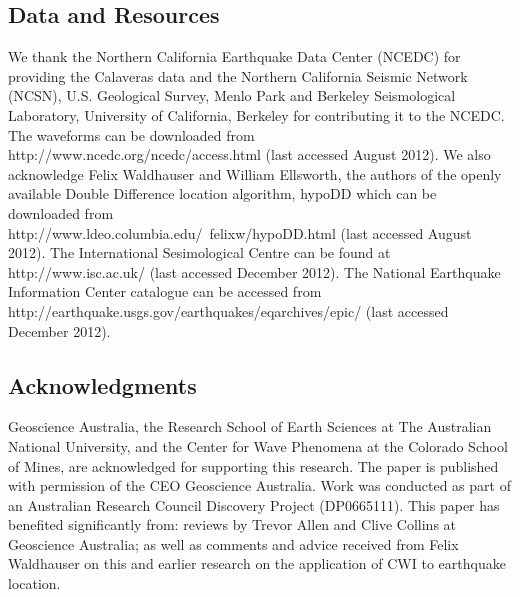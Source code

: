 \documentclass[12pt,double]{article}
\begin{document}
\vspace{2em}
\begin{centering}
\section*{Data and Resources}
\end{centering}
We thank the Northern California Earthquake Data Center (NCEDC) for
providing the Calaveras data and the Northern California Seismic
Network (NCSN), U.S. Geological Survey, Menlo Park and Berkeley
Seismological Laboratory, University of California, Berkeley for
contributing it to the NCEDC. The waveforms can be downloaded from \\
http://www.ncedc.org/ncedc/access.html (last accessed August 2012). 
We also acknowledge Felix
Waldhauser and William Ellsworth, the authors of the openly
available Double Difference location algorithm, hypoDD which can be
downloaded from \\
http://www.ldeo.columbia.edu/~felixw/hypoDD.html
(last accessed August 2012).
The International Sesimological Centre can be found at \\
http://www.isc.ac.uk/ (last accessed December 2012).
The National Earthquake
Information
Center catalogue can be accessed from \\
http://earthquake.usgs.gov/earthquakes/eqarchives/epic/
(last accessed December 2012).

\vspace{2em}
\begin{centering}
\section*{Acknowledgments}
\end{centering}

Geoscience Australia, the Research School of Earth Sciences at The
Australian National University, and the Center for Wave Phenomena at
the Colorado School of Mines, are acknowledged for supporting this
research. The paper is published with permission of the CEO
Geoscience Australia. Work was conducted as part of an Australian
Research Council Discovery Project (DP0665111).  This paper has
benefited significantly from: reviews by Trevor Allen and Clive Collins
at Geoscience Australia; as well as comments and advice received from
Felix Waldhauser on this and earlier research on the application of
CWI to earthquake location.

\vspace{2em}
\end{document}
